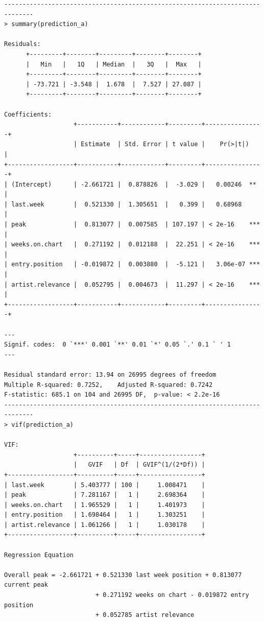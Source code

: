 \documentclass[11pt]{article} %
\begin{document}
\begin{verbatim}
------------------------------------------------------------------------------
> summary(prediction_a)

Residuals:
	  +---------+--------+---------+--------+--------+
	  |   Min   |   1Q   | Median  |   3Q   |  Max   |
	  +---------+--------+---------+--------+--------+
	  | -73.721 | -3.548 |  1.678  |  7.527 | 27.087 |
	  +---------+--------+---------+--------+--------+ 

Coefficients:
                   +-----------+------------+---------+----------------+
                   | Estimate  | Std. Error | t value |    Pr(>|t|)    |
+------------------+-----------+------------+---------+----------------+
| (Intercept)      | -2.661721 |  0.878826  |  -3.029 |   0.00246  **  |
| last.week        |  0.521330 |  1.305651  |   0.399 |   0.68968      |
| peak             |  0.813077 |  0.007585  | 107.197 | < 2e-16    *** |
| weeks.on.chart   |  0.271192 |  0.012188  |  22.251 | < 2e-16    *** |
| entry.position   | -0.019872 |  0.003880  |  -5.121 |   3.06e-07 *** |
| artist.relevance |  0.052795 |  0.004673  |  11.297 | < 2e-16    *** |
+------------------+-----------+------------+---------+----------------+

---
Signif. codes:  0 `***' 0.001 `**' 0.01 `*' 0.05 `.' 0.1 ` ' 1
---

Residual standard error: 13.94 on 26995 degrees of freedom
Multiple R-squared: 0.7252,    Adjusted R-squared: 0.7242
F-statistic: 685.1 on 104 and 26995 DF,  p-value: < 2.2e-16
------------------------------------------------------------------------------
> vif(prediction_a)

VIF:
                   +----------+-----+-----------------+
                   |   GVIF   | Df  | GVIF^(1/(2*Df)) |
+------------------+----------+-----+-----------------+
| last.week        | 5.403777 | 100 |     1.008471    |
| peak             | 7.281167 |   1 |     2.698364    |
| weeks.on.chart   | 1.965529 |   1 |     1.401973    |
| entry.position   | 1.698464 |   1 |     1.303251    |
| artist.relevance | 1.061266 |   1 |     1.030178    |
+------------------+----------+-----+-----------------+

Regression Equation

Overall peak = -2.661721 + 0.521330 last week position + 0.813077 current peak
                         + 0.271192 weeks on chart - 0.019872 entry position
                         + 0.052785 artist relevance
\end{verbatim}
\end{document}

